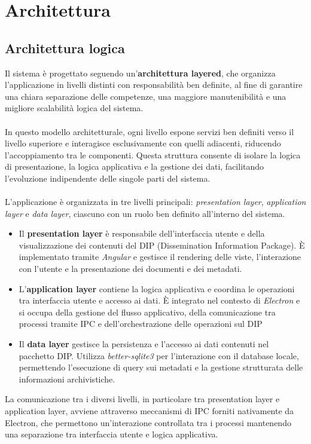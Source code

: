 \documentclass[a4paper,12pt]{article}
\begin{document}
    \section{Architettura} {
        \subsection{Architettura logica} {
            Il sistema è progettato seguendo un’\textbf{architettura layered}, che organizza l’applicazione in livelli distinti con responsabilità ben definite, al fine di garantire una chiara separazione delle competenze, una maggiore manutenibilità e una migliore scalabilità logica del sistema.\\
            \\
            In questo modello architetturale, ogni livello espone servizi ben definiti verso il livello superiore e interagisce esclusivamente con quelli adiacenti, riducendo l’accoppiamento tra le componenti. Questa struttura consente di isolare la logica di presentazione, la logica applicativa e la gestione dei dati, facilitando l’evoluzione indipendente delle singole parti del sistema.\\
            \\
            L’applicazione è organizzata in tre livelli principali: \textit{presentation layer}, \textit{application layer} e \textit{data layer}, ciascuno con un ruolo ben definito all’interno del sistema.
            \begin{itemize}
                \item Il \textbf{presentation layer} è responsabile dell’interfaccia utente e della visualizzazione dei contenuti del DIP (Dissemination Information Package). È implementato tramite \textit{Angular} e gestisce il rendering delle viste, l’interazione con l’utente e la presentazione dei documenti e dei metadati.
                \item L'\textbf{application layer} contiene la logica applicativa e coordina le operazioni tra interfaccia utente e accesso ai dati. È integrato nel contesto di \textit{Electron} e si occupa della gestione del flusso applicativo, della comunicazione tra processi tramite IPC e dell’orchestrazione delle operazioni sul DIP
                \item Il \textbf{data layer} gestisce la persistenza e l’accesso ai dati contenuti nel pacchetto DIP. Utilizza \textit{better-sqlite3} per l’interazione con il database locale, permettendo l’esecuzione di query sui metadati e la gestione strutturata delle informazioni archivistiche.\\
            \end{itemize}
            La comunicazione tra i diversi livelli, in particolare tra presentation layer e application layer, avviene attraverso meccanismi di IPC forniti nativamente da Electron, che permettono un’interazione controllata tra i processi mantenendo una separazione tra interfaccia utente e logica applicativa.
        }
        
}
\end{document}
